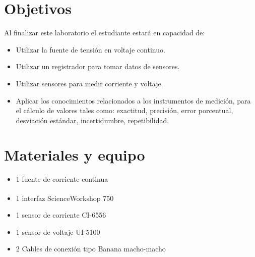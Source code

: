 \documentclass[12pt,letterpaper]{report}
\newcommand{\obj}{Objetivos}
\newcommand{\mat}{Materiales y equipo}
\newcommand{\capacidad}{Al finalizar este laboratorio el estudiante estará en capacidad de:}
\begin{document}
\section{\obj}
\capacidad
\begin{itemize}
\item Utilizar la fuente de tensión en voltaje continuo.
\item Utilizar un registrador para tomar datos de sensores.
\item Utilizar sensores para medir corriente y voltaje.
\item Aplicar los conocimientos relacionados a los instrumentos de medición, para el cálculo de valores tales como: exactitud, precisión, error porcentual, desviación estándar, incertidumbre, repetibilidad.
\end{itemize}

\section{\mat}
\begin{itemize}
\item 1 fuente de corriente continua
\item 1 interfaz ScienceWorkshop\,\textsuperscript{\textregistered}\,750
\item 1 sensor de corriente CI-6556
\item 1 sensor de voltaje UI-5100
\item 2 Cables de conexión tipo Banana macho-macho
\end{itemize}
\end{document}
